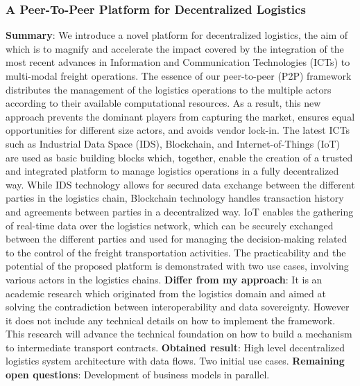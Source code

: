 \subsubsection{A Peer-To-Peer Platform for Decentralized Logistics \cite{peer-to-peerDecentralizedLogistics}}
\textbf{Summary}: We introduce a novel platform for decentralized logistics, the aim of which is to magnify and accelerate the impact covered by the integration of the most recent advances in Information and Communication Technologies (ICTs) to multi-modal freight operations. The essence of our peer-to-peer (P2P) framework distributes the management of the logistics operations to the multiple actors according to their available computational resources. As a result, this new approach prevents the dominant players from capturing the market, ensures equal opportunities for different size actors, and avoids vendor lock-in. The latest ICTs such as Industrial Data Space (IDS), Blockchain, and Internet-of-Things (IoT) are used as basic building blocks which, together, enable the creation of a trusted and integrated platform to manage logistics operations in a fully decentralized way. While IDS technology allows for secured data exchange between the different parties in the logistics chain, Blockchain technology handles transaction history and agreements between parties in a decentralized way. IoT enables the gathering of real-time data over the logistics network, which can be securely exchanged between the different parties and used for managing the decision-making related to the control of the freight transportation activities. The practicability and the potential of the proposed platform is demonstrated with two use cases, involving various actors in the logistics chains.\newline
\textbf{Differ from my approach}: It is an academic research which originated from the logistics domain and aimed at solving the contradiction between interoperability and data sovereignty. However it does not include any technical details on how to implement the framework. This research will advance the technical foundation on how to build a mechanism to intermediate transport contracts.\newline
\textbf{Obtained result}: High level decentralized logistics system architecture with data flows. Two initial use cases.\newline
\textbf{Remaining open questions}: Development of business models in parallel.\newline
